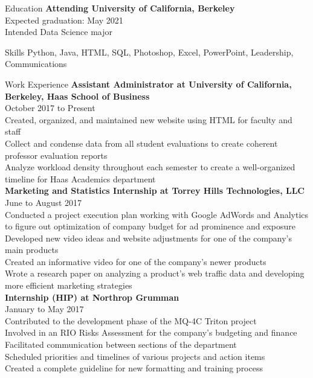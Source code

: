 \documentclass{resume}
\begin{document}
\begin{rSection}{Education}
{\bf Attending University of California, Berkeley} \hfill  
\\ Expected graduation: May 2021
\\ Intended Data Science major
\end{rSection}

\begin{rSection}{Skills}
 Python, Java, HTML, SQL, Photoshop, Excel, PowerPoint, Leadership, Communications
\end{rSection}

\begin{rSection}{Work Experience}
{\bf Assistant Administrator at University of California, Berkeley, Haas School of Business}
\\October 2017 to Present
\\Created, organized, and maintained new website using HTML for faculty and staff
\\Collect and condense data from all student evaluations to create coherent professor evaluation reports
\\Analyze workload density throughout each semester to create a well-organized timeline for Haas Academics department\\

{\bf Marketing and Statistics Internship at Torrey Hills Technologies, LLC }
\\June to August 2017
\\Conducted a project execution plan working with Google AdWords and Analytics to figure out optimization of company budget for ad prominence and exposure
\\Developed new video ideas and website adjustments for one of the company's main products
\\Created an informative video for one of the company's newer products
\\Wrote a research paper on analyzing a product's web traffic data and developing more efficient marketing strategies\\

{\bf Internship (HIP) at Northrop Grumman}
\\January to May 2017
\\Contributed to the development phase of the MQ-4C Triton project
\\Involved in an RIO Risks Assessment for the company’s budgeting and finance
\\Facilitated communication between sections of the department
\\Scheduled priorities and timelines of various projects and action items
\\Created a complete guideline for new formatting and training process
\end{rSection}
\end{document}
